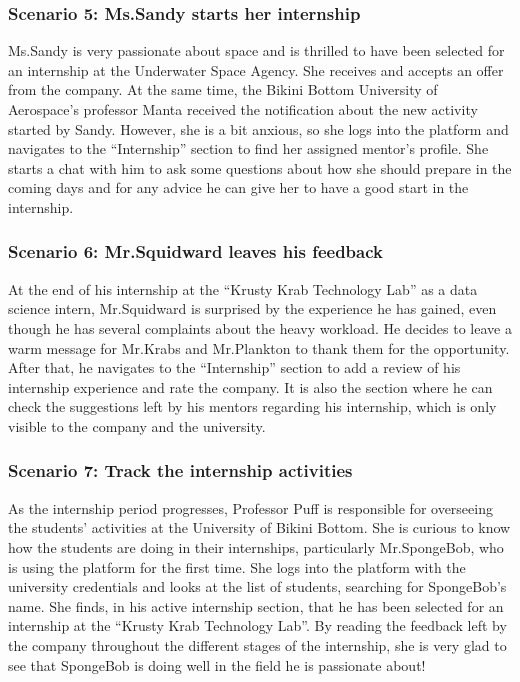 \subsubsection{Scenario 5: Ms.Sandy starts her internship}\label{subsubsec:scenario_5}
Ms.Sandy is very passionate about space and is thrilled to have been selected for an internship at the Underwater Space Agency. She receives 
and accepts an offer from the company. At the same time, the Bikini Bottom University of Aerospace's professor Manta received the notification
about the new activity started by Sandy. However, she is a bit anxious, so she logs into the platform and navigates to the ``Internship'' 
section to find her assigned mentor's profile. She starts a chat with him to ask some questions about how she should prepare in the coming days
and for any advice he can give her to have a good start in the internship.

\subsubsection{Scenario 6: Mr.Squidward leaves his feedback}\label{subsubsec:scenario_6}
At the end of his internship at the ``Krusty Krab Technology Lab'' as a data science intern, Mr.Squidward is surprised by the experience 
he has gained, even though he has several complaints about the heavy workload. He decides to leave a warm message for Mr.Krabs and Mr.Plankton 
to thank them for the opportunity. After that, he navigates to the ``Internship'' section to add a review of his internship experience and rate 
the company. It is also the section where he can check the suggestions left by his mentors regarding his internship, which is only visible to the 
company and the university.

\subsubsection{Scenario 7: Track the internship activities}\label{subsubsec:scenario_7}
As the internship period progresses, Professor Puff is responsible for overseeing the students' activities at the University of Bikini Bottom. 
She is curious to know how the students are doing in their internships, particularly Mr.SpongeBob, who is using the platform for the first time. 
She logs into the platform with the university credentials and looks at the list of students, searching for SpongeBob's name. She finds, 
in his active internship section, that he has been selected for an internship at the ``Krusty Krab Technology Lab''. By reading the feedback 
left by the company throughout the different stages of the internship, she is very glad to see that SpongeBob is doing well in the field he is 
passionate about!


